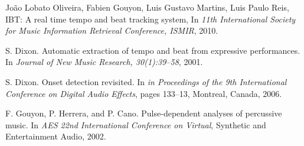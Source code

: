 \documentclass[12pt,a4paper,titlepage]{report}
\begin{document}
\begin{thebibliography}{99}
\begin{small}

Jo\~ao Lobato Oliveira, Fabien Gouyon, Luis Gustavo Martins, Luis Paulo Reis, IBT: A real time tempo and beat tracking system, In \emph{11th International Society for Music Information Retrieval Conference, ISMIR}, 2010.

S. Dixon. Automatic extraction of tempo and beat from
expressive performances. In \emph{Journal of New Music Research, 30(1):39–58}, 2001.

S. Dixon. Onset detection revisited. In \emph{in Proceedings of the 9th International Conference on Digital Audio Effects}, pages 133–13, Montreal, Canada, 2006.

F. Gouyon, P. Herrera, and P. Cano. Pulse-dependent analyses of percussive music. In \emph{AES 22nd International Conference on Virtual}, Synthetic and Entertainment Audio, 2002.

\end{small}
\end{thebibliography}
\end{document}
